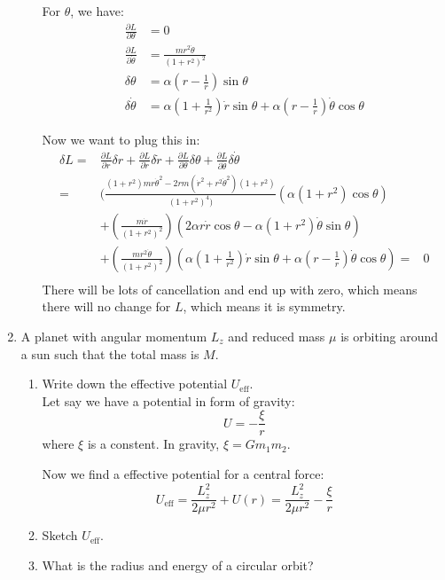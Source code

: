 \documentclass{article}
\begin{document}
\begin{enumerate}
\begin{enumerate}
        For $\theta$, we have:
        \begin{align*}
            \frac{\partial L}{\partial \theta} &= 0 \\
            \frac{\partial L}{\partial \dot \theta} &= \frac{mr^2\dot\theta}{(1+r^2)^2}\\
            \delta\theta &= \alpha(r - \frac{1}{r})\sin\theta\\
            \delta \dot \theta &= \alpha (1 + \frac{1}{r^2}) \dot r \sin\theta + \alpha (r - \frac{1}{r})\dot \theta \cos\theta
        \end{align*}

        Now we want to plug this in:
        \begin{align*}
            \delta L =& 
            \frac{\partial L}{\partial r}\delta r + \frac{\partial L}{\partial \dot r}\delta \dot r + \frac{\partial L}{\partial \theta}\delta \theta + \frac{\partial L}{\partial \dot \theta}\delta \dot \theta\\
            =& (\frac{(1+r^2)mr\dot\theta^2 - 2r m(\dot r^2 + r^2\dot\theta^2)(1+r^2)}{(1+r^2)^4)} (\alpha(1+r^2)\cos\theta) \\
            &+ (\frac{m\dot r}{(1+r^2)^2})(2\alpha r\dot r \cos\theta - \alpha (1+r^2)\dot\theta \sin\theta) \\
            &+ (\frac{mr^2\dot\theta}{(1+r^2)^2})(\alpha (1 + \frac{1}{r^2}) \dot r \sin\theta + \alpha (r - \frac{1}{r})\dot \theta \cos\theta)
            =& 0
            \\
        \end{align*}
        There will be lots of cancellation and end up with zero, which means there will no change for $L$, which means it is symmetry.

    \end{enumerate}

        \item A planet with angular momentum $L_z$ and reduced mass $\mu$ is orbiting around a sun such that the total mass is $M$.
        \begin{enumerate}
            \item Write down the effective potential $U_\text{eff}$.\\

            Let say we have a potential in form of gravity:
            \[
            U = -\frac{\xi}{r}
            \]
            where $\xi$ is a constent. In gravity, $\xi = G m_1m_2$.

            Now we find a effective potential for a central force:
            \[
            U_\text{eff} = \frac{L_z^2}{2\mu r^2} + U(r) = \frac{L_z^2}{2\mu r^2} - \frac{\xi}{r}
            \]
            \item Sketch $U_\text{eff}$.
            \\[2in]
            \item What is the radius and energy of a circular orbit?\\


\end{enumerate}
\end{enumerate}
\end{document}
